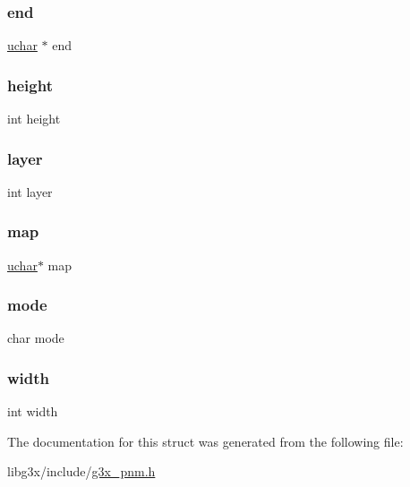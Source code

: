 \subsubsection{\texorpdfstring{end}{end}}
{\footnotesize\ttfamily \hyperlink{g3x__types_8h_a65f85814a8290f9797005d3b28e7e5fc}{uchar} $\ast$ end}

\mbox{\label{struct_g3_xpnm_ad12fc34ce789bce6c8a05d8a17138534}} 
\subsubsection{\texorpdfstring{height}{height}}
{\footnotesize\ttfamily int height}

\mbox{\label{struct_g3_xpnm_af5e6403cb6864751421a5e7249e4cc62}} 
\subsubsection{\texorpdfstring{layer}{layer}}
{\footnotesize\ttfamily int layer}

\mbox{\label{struct_g3_xpnm_a000e8e2f53a1c0edd509f9a125c24d09}} 
\subsubsection{\texorpdfstring{map}{map}}
{\footnotesize\ttfamily \hyperlink{g3x__types_8h_a65f85814a8290f9797005d3b28e7e5fc}{uchar}$\ast$ map}

\mbox{\label{struct_g3_xpnm_a000e34997df38c2005a83d63e67d9282}} 
\subsubsection{\texorpdfstring{mode}{mode}}
{\footnotesize\ttfamily char mode}

\mbox{\label{struct_g3_xpnm_a2474a5474cbff19523a51eb1de01cda4}} 
\subsubsection{\texorpdfstring{width}{width}}
{\footnotesize\ttfamily int width}



The documentation for this struct was generated from the following file\+:\begin{DoxyCompactItemize}
\item 
libg3x/include/\hyperlink{g3x__pnm_8h}{g3x\+\_\+pnm.\+h}\end{DoxyCompactItemize}
